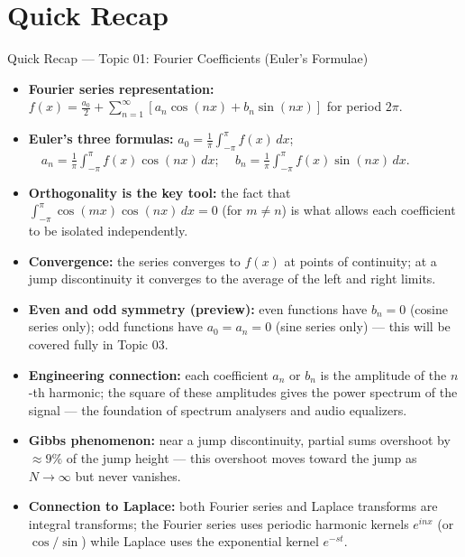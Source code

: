\documentclass[12pt,a4paper]{article}
\begin{document}
\section{Quick Recap}

\begin{learnbox}{Quick Recap --- Topic 01: Fourier Coefficients (Euler's Formulae)}
\begin{itemize}
  \item \textbf{Fourier series representation:} $f(x) = \frac{a_0}{2} + \sum_{n=1}^{\infty}\left[a_n\cos(nx) + b_n\sin(nx)\right]$ for period $2\pi$.
  \item \textbf{Euler's three formulas:} $a_0 = \frac{1}{\pi}\int_{-\pi}^{\pi}f(x)\,dx$; $\quad a_n = \frac{1}{\pi}\int_{-\pi}^{\pi}f(x)\cos(nx)\,dx$; $\quad b_n = \frac{1}{\pi}\int_{-\pi}^{\pi}f(x)\sin(nx)\,dx$.
  \item \textbf{Orthogonality is the key tool:} the fact that $\int_{-\pi}^{\pi}\cos(mx)\cos(nx)\,dx = 0$ (for $m \ne n$) is what allows each coefficient to be isolated independently.
  \item \textbf{Convergence:} the series converges to $f(x)$ at points of continuity; at a jump discontinuity it converges to the average of the left and right limits.
  \item \textbf{Even and odd symmetry (preview):} even functions have $b_n = 0$ (cosine series only); odd functions have $a_0 = a_n = 0$ (sine series only) --- this will be covered fully in Topic 03.
  \item \textbf{Engineering connection:} each coefficient $a_n$ or $b_n$ is the amplitude of the $n$-th harmonic; the square of these amplitudes gives the power spectrum of the signal --- the foundation of spectrum analysers and audio equalizers.
  \item \textbf{Gibbs phenomenon:} near a jump discontinuity, partial sums overshoot by $\approx 9\%$ of the jump height --- this overshoot moves toward the jump as $N \to \infty$ but never vanishes.
  \item \textbf{Connection to Laplace:} both Fourier series and Laplace transforms are integral transforms; the Fourier series uses periodic harmonic kernels $e^{inx}$ (or $\cos/\sin$) while Laplace uses the exponential kernel $e^{-st}$.
\end{itemize}
\end{learnbox}
\end{document}
